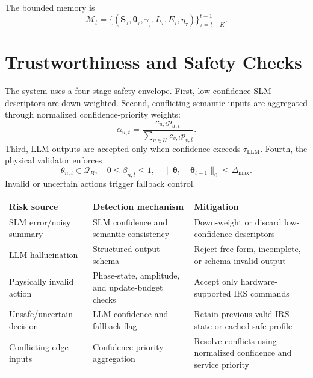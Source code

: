 \documentclass[11pt]{article}
\begin{document}
The bounded memory is
\begin{equation}
\mathcal{M}_{t}=\{(\mathbf{S}_{\tau},\boldsymbol{\theta}_{\tau},\gamma_{\tau},L_{\tau},E_{\tau},\eta_{\tau})\}_{\tau=t-K}^{t-1}.
\end{equation}

\section{Trustworthiness and Safety Checks}

The system uses a four-stage safety envelope. First, low-confidence SLM descriptors are down-weighted. Second, conflicting semantic inputs are aggregated through normalized confidence-priority weights:
\begin{equation}
\alpha_{u,t}=\frac{c_{u,t}p_{u,t}}{\sum_{v\in\mathcal{U}}c_{v,t}p_{v,t}}.
\end{equation}
Third, LLM outputs are accepted only when confidence exceeds $\tau_{\mathrm{LLM}}$. Fourth, the physical validator enforces
\begin{equation}
\theta_{n,t}\in\mathcal{Q}_{B},\quad 0\leq\beta_{n,t}\leq1,\quad \|\boldsymbol{\theta}_{t}-\boldsymbol{\theta}_{t-1}\|_0\leq\Delta_{\max}.
\end{equation}
Invalid or uncertain actions trigger fallback control.

\begin{center}
\begin{tabular}{p{3.4cm}p{4.5cm}p{5.0cm}}
\toprule
Risk source & Detection mechanism & Mitigation \\
\midrule
SLM error/noisy summary & SLM confidence and semantic consistency & Down-weight or discard low-confidence descriptors \\
LLM hallucination & Structured output schema & Reject free-form, incomplete, or schema-invalid output \\
Physically invalid action & Phase-state, amplitude, and update-budget checks & Accept only hardware-supported IRS commands \\
Unsafe/uncertain decision & LLM confidence and fallback flag & Retain previous valid IRS state or cached-safe profile \\
Conflicting edge inputs & Confidence-priority aggregation & Resolve conflicts using normalized confidence and service priority \\
\bottomrule
\end{tabular}
\end{center}
\end{document}
